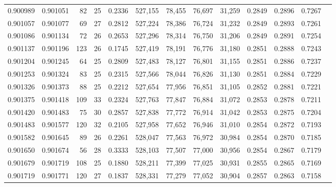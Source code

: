 \begin{tabular}{rrrrrrrrrrrrr}
0.900989 & 0.901051 &    82 &  25 &                                     0.2336 & 527,155 &  78,455 &  76,697 &  31,259 & 0.2849 & 0.2896 & 0.7267 \\
0.901057 & 0.901077 &    69 &  27 &                                     0.2812 & 527,224 &  78,386 &  76,724 &  31,232 & 0.2849 & 0.2893 & 0.7261 \\
0.901086 & 0.901134 &    72 &  26 &                                     0.2653 & 527,296 &  78,314 &  76,750 &  31,206 & 0.2849 & 0.2891 & 0.7254 \\
0.901137 & 0.901196 &   123 &  26 &                                     0.1745 & 527,419 &  78,191 &  76,776 &  31,180 & 0.2851 & 0.2888 & 0.7243 \\
0.901204 & 0.901245 &    64 &  25 &                                     0.2809 & 527,483 &  78,127 &  76,801 &  31,155 & 0.2851 & 0.2886 & 0.7237 \\
0.901253 & 0.901324 &    83 &  25 &                                     0.2315 & 527,566 &  78,044 &  76,826 &  31,130 & 0.2851 & 0.2884 & 0.7229 \\
0.901326 & 0.901373 &    88 &  25 &                                     0.2212 & 527,654 &  77,956 &  76,851 &  31,105 & 0.2852 & 0.2881 & 0.7221 \\
0.901375 & 0.901418 &   109 &  33 &                                     0.2324 & 527,763 &  77,847 &  76,884 &  31,072 & 0.2853 & 0.2878 & 0.7211 \\
0.901420 & 0.901483 &    75 &  30 &                                     0.2857 & 527,838 &  77,772 &  76,914 &  31,042 & 0.2853 & 0.2875 & 0.7204 \\
0.901483 & 0.901577 &   120 &  32 &                                     0.2105 & 527,958 &  77,652 &  76,946 &  31,010 & 0.2854 & 0.2872 & 0.7193 \\
0.901582 & 0.901645 &    89 &  26 &                                     0.2261 & 528,047 &  77,563 &  76,972 &  30,984 & 0.2854 & 0.2870 & 0.7185 \\
0.901650 & 0.901674 &    56 &  28 &                                     0.3333 & 528,103 &  77,507 &  77,000 &  30,956 & 0.2854 & 0.2867 & 0.7179 \\
0.901679 & 0.901719 &   108 &  25 &                                     0.1880 & 528,211 &  77,399 &  77,025 &  30,931 & 0.2855 & 0.2865 & 0.7169 \\
0.901719 & 0.901771 &   120 &  27 &                                     0.1837 & 528,331 &  77,279 &  77,052 &  30,904 & 0.2857 & 0.2863 & 0.7158 \\

\end{tabular}
